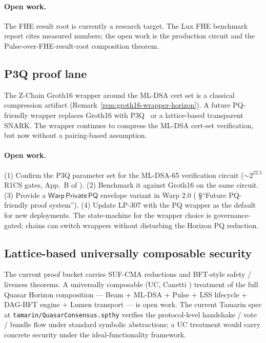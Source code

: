 \paragraph{Open work.} The FHE result root is currently a research target. The Lux FHE benchmark report \cite{luxbenchmarks} cites measured numbers; the open work is the production circuit and the Pulse-over-FHE-result-root composition theorem.

\subsection{P3Q proof lane}

The Z-Chain Groth16 wrapper around the ML-DSA cert set is a classical compression artifact (Remark~\ref{rem:groth16-wrapper-horizon}). A future PQ-friendly wrapper replaces Groth16 with P3Q~\cite{luxp3q} or a lattice-based transparent SNARK. The wrapper continues to compress the ML-DSA cert-set verification, but now without a pairing-based assumption.

\paragraph{Open work.} (1) Confirm the P3Q parameter set for the ML-DSA-65 verification circuit ($\sim 2^{22.5}$ R1CS gates, App.~B of \cite{quasarcertsoundness}). (2) Benchmark it against Groth16 on the same circuit. (3) Provide a $\mathsf{Warp\,Private\,PQ}$ envelope variant in Warp 2.0 (\cite{luxwarpv2} \S``Future PQ-friendly proof system''). (4) Update LP-307 with the PQ wrapper as the default for new deployments. The state-machine for the wrapper choice is governance-gated; chains can switch wrappers without disturbing the Horizon PQ reduction.

\subsection{Lattice-based universally composable security}

The current proof bucket carries SUF-CMA reductions and BFT-style safety / liveness theorems. A universally composable (UC, Canetti \cite{canetti2001uc}) treatment of the full Quasar Horizon composition --- Beam + ML-DSA + Pulse + LSS lifecycle + DAG-BFT engine + Lumen transport --- is open work. The current Tamarin spec at \texttt{tamarin/QuasarConsensus.spthy} verifies the protocol-level handshake / vote / bundle flow under standard symbolic abstractions; a UC treatment would carry concrete security under the ideal-functionality framework.

